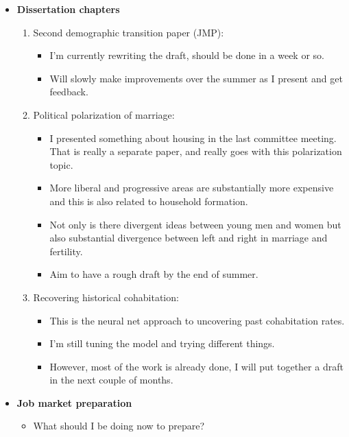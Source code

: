 \documentclass{article}
\begin{document}
\begin{itemize}
\item \textbf{Dissertation chapters}
\begin{enumerate}
\item Second demographic transition paper (JMP): 
\begin{itemize}
	\item I'm currently rewriting the draft, should be done in a week or so.
	\item Will slowly make improvements over the summer as I present and get feedback.
\end{itemize}


\item Political polarization of marriage: 
\begin{itemize}
	\item I presented something about housing in the last committee meeting. That is really a separate paper, and really goes with this polarization topic.
	\item More liberal and progressive areas are substantially more expensive and this is also related to household formation.
	\item Not only is there divergent ideas between young men and women but also substantial divergence between left and right in marriage and fertility.
	\item Aim to have a rough draft by the end of summer.
\end{itemize}
\item Recovering historical cohabitation:
\begin{itemize}
	\item This is the neural net approach to uncovering past cohabitation rates.
	\item I'm still tuning the model and trying different things.
	\item However, most of the work is already done, I will put together a draft in the next couple of months.
\end{itemize}

\end{enumerate}

\item \textbf{Job market preparation}
\begin{itemize}
	\item What should I be doing now to prepare?
\end{itemize}

\vspace{0.5cm}






\end{itemize}


\newpage

%
\end{document}
